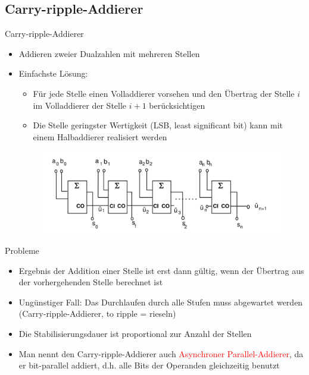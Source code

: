 \documentclass[12pt%
,xcolor=table
,aspectratio=169%
]{beamer}
\begin{document}
\subsection{Carry-ripple-Addierer}

\begin{frame}{Carry-ripple-Addierer}
\begin{itemize}
	\item Addieren zweier Dualzahlen mit mehreren Stellen
	\item Einfachste Lösung:
	\begin{itemize}
		\item Für jede Stelle einen Volladdierer vorsehen und den Übertrag der Stelle $i$ im Volladdierer der Stelle $i+1$ berücksichtigen
		\item Die Stelle geringster Wertigkeit (LSB, least significant bit) kann mit einem Halbaddierer realisiert werden
	\end{itemize}
\begin{figure}
\center
\includegraphics[scale=0.3]{pictures/carry_ripple_adder}
\end{figure}
\end{itemize}
\end{frame}

\begin{frame}{Probleme}
\begin{itemize}
	\item Ergebnis der Addition einer Stelle ist erst dann gültig, wenn der Übertrag aus der vorhergehenden Stelle berechnet ist
	\item Ungünstiger Fall: Das Durchlaufen durch alle Stufen muss abgewartet werden (Carry-ripple-Addierer, to ripple = rieseln)
	\item Die Stabilisierungsdauer ist proportional zur Anzahl der Stellen
	\item Man nennt den Carry-ripple-Addierer auch \textcolor{red}{Asynchroner Parallel-Addierer}, da er bit-parallel addiert, d.h. alle Bits der Operanden gleichzeitig benutzt
\end{itemize}
\end{frame}
\end{document}

